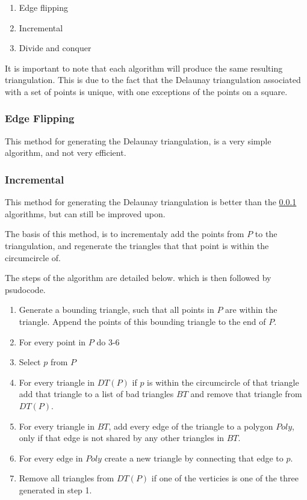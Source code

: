 \documentclass[fem.tex]{subfiles}
\begin{document}
\begin{enumerate}
  \item Edge flipping
  \item Incremental
  \item Divide and conquer
\end{enumerate}

It is important to note that each algorithm will produce the same resulting
triangulation. This is due to the fact that the Delaunay triangulation
associated with a set of points is unique, with one exceptions of the points on
a square.

\subsubsection{Edge Flipping}%
\label{ssub:edge_flipping}

This method for generating the Delaunay triangulation, is a very simple
algorithm, and not very efficient.

\subsubsection{Incremental}%
\label{ssub:incremental}

This method for generating the Delaunay triangulation is better than the
\ref{ssub:edge_flipping} algorithms, but can still be improved upon.

The basis of this method, is to incrementaly add the points from $P$ to the
triangulation, and regenerate the triangles that that point is within the
circumcircle of.

The steps of the algorithm are detailed below. which is then followed by
psudocode.

\begin{enumerate}
  \item Generate a bounding triangle, such that all points in $P$ are within
    the triangle. Append the points of this bounding triangle to the end of
    $P$.
  \item For every point in $P$ do 3-6
  \item Select $p$ from $P$
  \item For every triangle in $DT(P)$ if $p$ is within the circumcircle of that
    triangle add that triangle to a list of bad triangles $BT$ and remove that
    triangle from $DT(P)$.
  \item For every triangle in $BT$, add every edge of the triangle to a polygon
    $Poly$, only if that edge is not shared by any other triangles in $BT$.
  \item For every edge in $Poly$ create a new triangle by connecting that edge
    to $p$.
  \item Remove all triangles from $DT(P)$ if one of the verticies is one of the
    three generated in step 1.
\end{enumerate}
\end{document}
